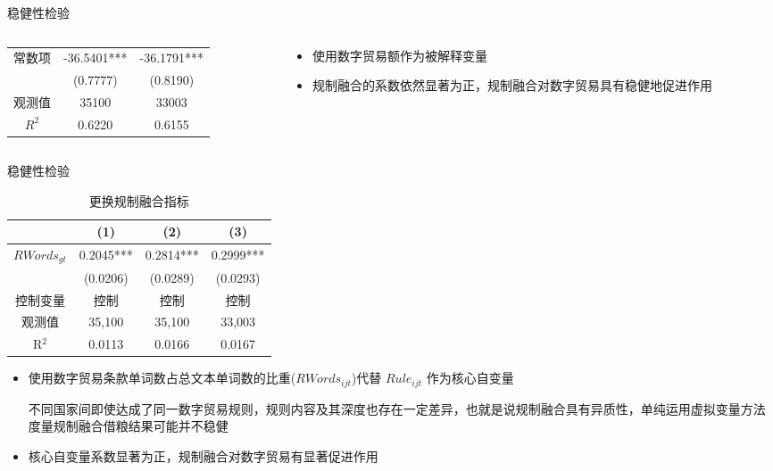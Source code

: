 \documentclass{beamer}
\begin{document}
\begin{frame}{稳健性检验}
\begin{columns}[T]
\begin{column}{0.6\textwidth}
\begin{threeparttable}
\begin{tabular}{ccc}
                    常数项 & -36.5401*** & -36.1791*** \\
                    & (0.7777) & (0.8190) \\
                    观测值 & 35100 & 33003 \\
                    $R^2$ & 0.6220 & 0.6155 \\
                    \bottomrule
                \end{tabular}
            \end{threeparttable}
        \end{column}
        \begin{column}{0.4\textwidth}
            \vspace*{4em}
            \begin{itemize}
                \item 使用数字贸易额作为被解释变量
                \item 规制融合的系数依然显著为正，规制融合对数字贸易具有稳健地促进作用
            \end{itemize}
        \end{column}
    \end{columns}
\end{frame}

\begin{frame}{稳健性检验}
    \vspace*{-0.8em}
    \begin{table}
        \centering
        \caption{更换规制融合指标}
        \label{tab:robustness_check}
        \begin{tabular}{cccc}
            \toprule
            & (1) & (2) & (3) \\
            \midrule
            $RWords_{gt}$ & 0.2045*** & 0.2814*** & 0.2999*** \\
             & (0.0206) & (0.0289) & (0.0293) \\
            控制变量 & 控制 & 控制 & 控制 \\
            观测值 & 35,100 & 35,100 & 33,003 \\
            R$^2$ & 0.0113 & 0.0166 & 0.0167 \\
            \bottomrule
        \end{tabular}
    \end{table}
    \small
    \begin{itemize}
        \item 使用数字贸易条款单词数占总文本单词数的比重($RWords_{ijt}$)代替 $Rule_{ijt}$ 作为核心自变量 \\
        \begin{scriptsize} 
            不同国家间即使达成了同一数字贸易规则，规则内容及其深度也存在一定差异，也就是说规制融合具有异质性，单纯运用虚拟变量方法度量规制融合借粮结果可能并不稳健
        \end{scriptsize}
        \item 核心自变量系数显著为正，规制融合对数字贸易有显著促进作用
    \end{itemize}
\end{frame}
\end{document}
